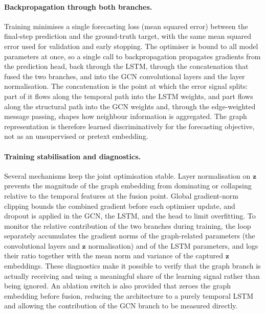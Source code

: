 \paragraph{Backpropagation through both branches.}
Training minimises a single forecasting loss (mean squared error) between the
final-step prediction and the ground-truth target, with the same mean squared
error used for validation and early stopping. The optimiser is bound to all model
parameters at once, so a single call to backpropagation propagates gradients
from the prediction head, back through the LSTM, through the concatenation that
fused the two branches, and into the GCN convolutional layers and the layer
normalisation. The concatenation is the point at which the error signal splits:
part of it flows along the temporal path into the LSTM weights, and part flows
along the structural path into the GCN weights and, through the edge-weighted
message passing, shapes how neighbour information is aggregated. The graph
representation is therefore learned discriminatively for the forecasting
objective, not as an unsupervised or pretext embedding.

\paragraph{Training stabilisation and diagnostics.}
Several mechanisms keep the joint optimisation stable. Layer normalisation on
$\mathbf{z}$ prevents the magnitude of the graph embedding from dominating or
collapsing relative to the temporal features at the fusion point. Global
gradient-norm clipping bounds the combined gradient before each optimiser
update, and dropout is applied in the GCN, the LSTM, and the head to limit
overfitting. To monitor the relative contribution of the two branches during
training, the loop separately accumulates the gradient norms of the
graph-related parameters (the convolutional layers and $\mathbf{z}$
normalisation) and of the LSTM parameters, and logs their ratio together with
the mean norm and variance of the captured $\mathbf{z}$ embeddings. These
diagnostics make it possible to verify that the graph branch is actually
receiving and using a meaningful share of the learning signal rather than being
ignored. An ablation switch is also provided that zeroes the graph embedding
before fusion, reducing the architecture to a purely temporal LSTM and allowing
the contribution of the GCN branch to be measured directly.

